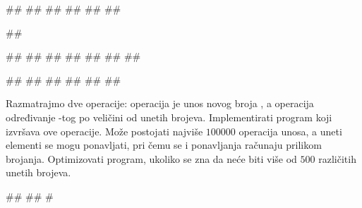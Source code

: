 \begin{Exercise}[label=3-24]
\begin{minitest}
\begin{test}{2}
#\naslovIzlaz#
##
##
##
##
##
\end{test}
\end{minitest}
\begin{minitest}
\begin{test}{3}
##
  
##
##
##
##
##
##
##

#\naslovIzlaz#
##
##
##
##
##
\end{test}
\end{minitest}

\end{Exercise}

\begin{Answer}[ref=3-24]
\end{Answer}
\begin{Exercise}[difficulty=2, label=3-25]
  Razmatrajmo dve operacije: operacija  je unos novog broja
  , a operacija  određivanje -tog po
  veličini od unetih brojeva. Implementirati program koji izvršava ove
  operacije. Može postojati najviše $100000$ operacija unosa, a uneti
  elementi se mogu ponavljati, pri čemu se i ponavljanja računaju
  prilikom brojanja.  Optimizovati program,
  ukoliko se zna da neće biti više od $500$ različitih unetih brojeva.
  
\begin{maxitest}
\begin{upotreba}{1}
#\naslovInt#
##
#
\end{upotreba}
\end{maxitest}
  
\end{Exercise}


